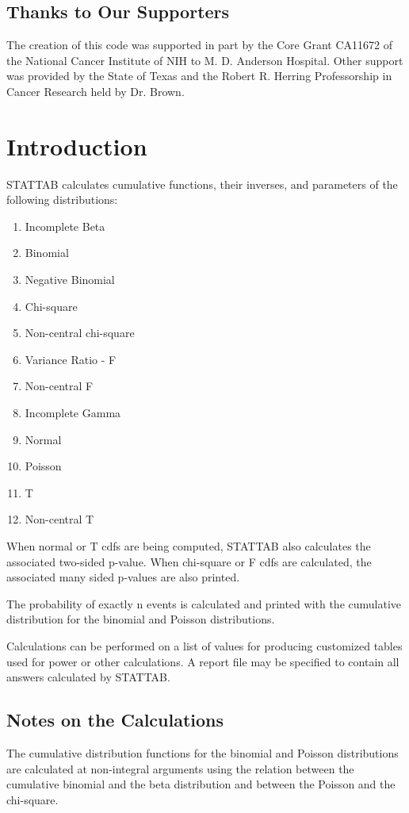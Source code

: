 \documentclass[12pt,dvips]{article}
\newcommand{\mysection}[1]
    {\color{blue} \section{#1} \color{black}}
\newcommand{\mysubsection}[1]
    {\color{green}\subsection{#1}\color{black}}
\begin{document}
\mysubsection{Thanks to Our Supporters}
     
The creation  of this  code was  supported in part  by the  Core Grant
CA11672 of  the National  Cancer Institute of  NIH to M.   D. Anderson
Hospital.  Other  support was provided by  the State of  Texas and the
Robert R. Herring Professorship in Cancer Research held by Dr.  Brown.
     
\pagebreak

\mysection{Introduction}

     STATTAB    calculates    cumulative functions,  their   inverses,  and
     parameters of the following distributions:

\begin{enumerate}
\item{Incomplete Beta}
\item{Binomial}
\item{Negative Binomial}
\item{Chi-square}
\item{Non-central chi-square}
\item{Variance Ratio - F}
\item{Non-central F}
\item{Incomplete Gamma}
\item{Normal}
\item{Poisson}
\item{T}
\item{Non-central T}
\end{enumerate}
     
     When normal or T cdfs are being  computed, STATTAB also
     calculates  the associated two-sided  p-value.  When  chi-square  or F
     cdfs  are calculated,  the associated  many sided   p-values are  also
     printed.
     
     The probability of exactly n events is calculated and printed with the
     cumulative distribution for the binomial and Poisson distributions.
     
     Calculations  can be  performed  on a list  of  values  for  producing
     customized tables used for power or other calculations.  A report file
     may be specified to contain all answers calculated by STATTAB.
     
\mysubsection{ Notes on the Calculations}
     
     The  cumulative distribution functions   for the binomial  and Poisson
     distributions  are   calculated at  non-integral  arguments  using the
     relation between the cumulative binomial and the beta distribution and
     between the Poisson and the chi-square.
     
\end{document}
